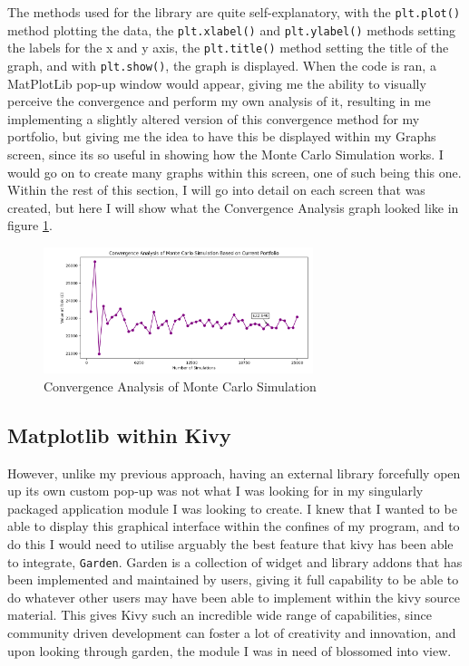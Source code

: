 \documentclass{article}
\begin{document}
\vspace{0.3cm}
The methods used for the library are quite self-explanatory, with the \texttt{plt.plot()} method plotting the data, the \texttt{plt.xlabel()} and \texttt{plt.ylabel()} methods setting the labels for the x and y axis, the \texttt{plt.title()} method setting the title of the graph, and with \texttt{plt.show()}, the graph is displayed. When the code is ran, a MatPlotLib pop-up window would appear, giving me the ability to visually perceive the convergence and perform my own analysis of it, resulting in me implementing a slightly altered version of this convergence method for my portfolio, but giving me the idea to have this be displayed within my Graphs screen, since its so useful in showing how the Monte Carlo Simulation works. I would go on to create many graphs within this screen, one of such being this one. Within the rest of this section, I will go into detail on each screen that was created, but here I will show what the Convergence Analysis graph looked like in figure \ref{fig:Convergence Analysis}.\\\vspace{0.3cm}

\begin{figure}[h]
  \centering
  \includegraphics[width=0.7\textwidth]{Images/Term 2 Images/Image (1).png}
  \caption{Convergence Analysis of Monte Carlo Simulation}
  \label{fig:Convergence Analysis}
\end{figure}

\subsection{Matplotlib within Kivy}
However, unlike my previous approach, having an external library forcefully open up its own custom pop-up was not what I was looking for in my singularly packaged application module I was looking to create. I knew that I wanted to be able to display this graphical interface within the confines of my program, and to do this I would need to utilise arguably the best feature that kivy has been able to integrate, \texttt{Garden}. Garden is a collection of widget and library addons that has been implemented and maintained by users, giving it full capability to be able to do whatever other users may have been able to implement within the kivy source material. This gives Kivy such an incredible wide range of capabilities, since community driven development can foster a lot of creativity and innovation, and upon looking through garden, the module I was in need of blossomed into view.\\\vspace{0.3cm}
\end{document}

